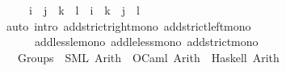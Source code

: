 \begin{isabellebody}
\ \ \ \ \ {\isachardoublequoteopen}i\ {\isacharless}{\kern0pt}\ j\ {\isasymand}\ k\ {\isacharless}{\kern0pt}\ l\ {\isasymLongrightarrow}\ i\ {\isacharplus}{\kern0pt}\ k\ {\isacharless}{\kern0pt}\ j\ {\isacharplus}{\kern0pt}\ l{\isachardoublequoteclose}\isanewline
%
\isadelimproof
\ \ %
\endisadelimproof
%
\isatagproof
{}\isamarkupfalse%
\ {\isacharparenleft}{\kern0pt}auto\ intro{\isacharcolon}{\kern0pt}\ add{\isacharunderscore}{\kern0pt}strict{\isacharunderscore}{\kern0pt}right{\isacharunderscore}{\kern0pt}mono\ add{\isacharunderscore}{\kern0pt}strict{\isacharunderscore}{\kern0pt}left{\isacharunderscore}{\kern0pt}mono\isanewline
\ \ \ \ \ \ add{\isacharunderscore}{\kern0pt}less{\isacharunderscore}{\kern0pt}le{\isacharunderscore}{\kern0pt}mono\ add{\isacharunderscore}{\kern0pt}le{\isacharunderscore}{\kern0pt}less{\isacharunderscore}{\kern0pt}mono\ add{\isacharunderscore}{\kern0pt}strict{\isacharunderscore}{\kern0pt}mono{\isacharparenright}{\kern0pt}%
\endisatagproof
{\isafoldproof}%
%
\isadelimproof
\isanewline
%
\endisadelimproof
\isanewline
{}\isamarkupfalse%
\isanewline
\ \ \ Groups\ {\isasymrightharpoonup}\ {\isacharparenleft}{\kern0pt}SML{\isacharparenright}{\kern0pt}\ Arith\ \ {\isacharparenleft}{\kern0pt}OCaml{\isacharparenright}{\kern0pt}\ Arith\ \ {\isacharparenleft}{\kern0pt}Haskell{\isacharparenright}{\kern0pt}\ Arith\isanewline
%
\isadelimtheory
\isanewline
%
\endisadelimtheory
%
\isatagtheory
{}\isamarkupfalse%
%
\endisatagtheory
{\isafoldtheory}%
%
\isadelimtheory
%
\endisadelimtheory
%
\end{isabellebody}%
\endinput
